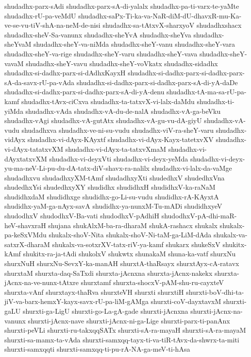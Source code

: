 {shudadhx-parx-sAdi
shudadhx-parx-sA-di-yalalx
shudadhx-pa-ti-varx-te-yaMte
shudadhx-rU-pa-veMdU
shudadhx-saPx-Ti-ka-va-NaR-diM-dU-dhavxR-mu-Ka-ve-se-vu-tiV-shA-na-neM-de-nisi
shudadhx-sa-tAtxvX-sharxyoV
shudadhxshacx
shudadhx-sheV-Sa-vanunx
shudadhx-sheYvA
shudadhx-sheYva
shudadhx-sheYvaM
shudadhx-sheY-va-niMda
shudadhx-sheY-vanu
shudadhx-sheY-vara
shudadhx-sheY-va-rige
shudadhx-sheY-varu
shudadhx-sheY-vava
shudadhx-sheY-vavaM
shudadhx-sheY-vavu
shudadhx-sheY-voVkatx
shudadhx-sidadhx
shudadhx-si-dadhx-parx-si-dAdhxKayxH
shudadhx-si-dadhx-parx-si-dadhx-parx-sA-da-savx-rU-pa-vAda
shudadhx-si-dadhx-parx-si-dadhx-parx-sA-di-yA-daDe
shudadhx-si-dadhx-parx-si-dadhx-parx-sA-di-yA-denu
shudadhx-tA-ma-sa-rU-pa-kamf
shudadhx-tAvx-ciCxva
shudadhx-ta-tatxvX-vi-lalx-daMdu
shudadhx-ti-yiMda
shudadhx-vAda
shudadhx-vA-du-de-nalA
shudadhx-vA-ga-beVku
shudadhx-vAgi
shudadhx-vA-gutAtx
shudadhx-vA-gu-vu-dA-giyU
shudadhx-vA-vudu
shudadhxva
shudadhx-ve-ni-su-vudu
shudadhx-viV-ra-sheY-varu
shudadhx-vidAyx
shudadhx-vi-dAyx-KAyxtf
shudadhx-vi-dAyx-Kayx-tatetxvXV
shudadhx-vi-dAyx-tatatxvXM
shudadhx-vi-dAyx-ta-tatxvXmaM
shudadhx-vi-dAyxtatxvXM
shudadhx-vi-deyxVti
shudadhx-vi-deyx-yeMda
shudadhx-vi-deyx-yu-ma-neV-Li-pu-du-dA-tatx-diV-shavx-ra-nalilx
shudadhx-vi-lalx-da-vaMge
shudadhxvu
shudadhxyXM-tAmf
shudadhxyXti
shudedhxV
shudedhxVna
shudedhxYsi
shudedhxyXY
shudidhx
shudidhxH
shudidhxV-ka-raNaM
shudidhxdaM
shudidhxge
shudidhx-go-Li-su-vudu
shudidhx-rA-KAyxtA
shudidhx-yaM-ga-nAyx-savA
shudidhx-ya-nunxM-Tu-mADi
shudidhxyeV
shudodhxV
shudodhxV-Ba-vati
shudodhxV-pAdhiH
shudodhxV-pA-dhi-maR-heV-shavxraH
shujana
shukAlxM-ba-ra-dharaM
shukA-rashacx
shukalx
shukalx-pa-keSxVMdu
shukalx-shoV-Nita
shukalx-shoV-Ni-taM-ga-LiM-dAda
shukalx-va-satxrX-dharaM
shukalx-va-sotxrXV-tatx-riV-ya-kamf
shukarx
shukeSxV
shukitx-kAmf
shukitx-ra-ja-tAdi
shukolxV
shukwtx
shunakaM
shuna-ka-vatf
shurxNu
shurxNuH
shurxNu-SevxY-ka-manAH
shurxtA-thaRsayx
shurxtAyx-cA-ratavx
shurxtaM
shurxta-daq-SaTxdi
shurxta-jAcnxna
shurxta-jAcnx-nakekx
shurxta-jAcnx-na-ve-nunx-tAtxre
shurxtamf
shurxta-shocxV-pAM-shu-ru-cayxteV
shurxta-vAnf
shurxtayx-thaRva
shurxteVH
shurxti
shurxtiH
shurxti-boV-dhi-ta-jiV-va-barx-hemxY-kayx-savx-rU-pa-liM-gAMga
shurxti-coV-dayxtavxM
shurxti-gaLU
shurxti-ga-LigU
shurxti-go-La-gA-gade
shurxti-jAcnxna
shurxti-jAcnx-na-vanunx
shurxti-jAcnx-nave
shurxti-jAcnx-ni-ga-Lige
shurxti-parx-ti-panAnx
shurxti-peVLi
shurxti-ru-takxqqSATx
shurxti-sA-ra-mayaH
shurxti-sA-ra-mayaM
shurxti-sa-mamx-ta-vAda
shurxti-samxqq-tayx-ti-va-tiR-tAvx-da-shwrx-ta-miti
shurxti-samxqqti
shurxti-samxqq-ti-pu-rA-NA-ga-meV-ti-hAsa
}
